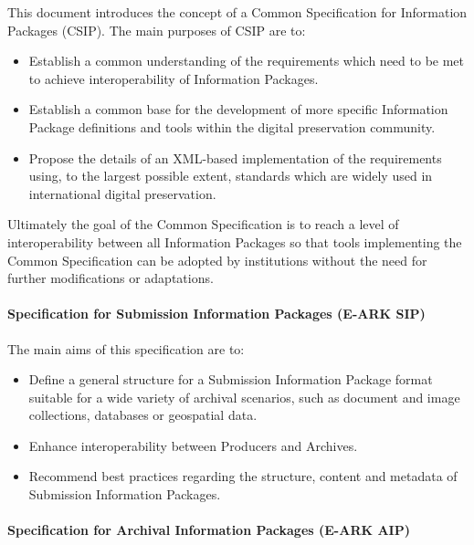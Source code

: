 This document introduces the concept of a Common Specification for
Information Packages (CSIP). The main purposes of CSIP are to:

\begin{itemize}
\tightlist
\item
  Establish a common understanding of the requirements which need to be
  met to achieve interoperability of Information Packages.
\item
  Establish a common base for the development of more specific
  Information Package definitions and tools within the digital
  preservation community.
\item
  Propose the details of an XML-based implementation of the requirements
  using, to the largest possible extent, standards which are widely used
  in international digital preservation.
\end{itemize}

Ultimately the goal of the Common Specification is to reach a level of
interoperability between all Information Packages so that tools
implementing the Common Specification can be adopted by institutions
without the need for further modifications or adaptations.

\hypertarget{specification-for-submission-information-packages-e-ark-sip}{%
\paragraph{Specification for Submission Information Packages (E-ARK
SIP)}\label{specification-for-submission-information-packages-e-ark-sip}}

The main aims of this specification are to:

\begin{itemize}
\tightlist
\item
  Define a general structure for a Submission Information Package format
  suitable for a wide variety of archival scenarios, such as document
  and image collections, databases or geospatial data.
\item
  Enhance interoperability between Producers and Archives.
\item
  Recommend best practices regarding the structure, content and metadata
  of Submission Information Packages.
\end{itemize}

\hypertarget{specification-for-archival-information-packages-e-ark-aip}{%
\paragraph{Specification for Archival Information Packages (E-ARK
AIP)}\label{specification-for-archival-information-packages-e-ark-aip}}

